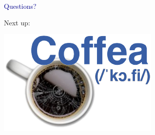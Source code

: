 \documentclass[aspectratio=169]{beamer}
\begin{document}
\begin{frame}{}
\Huge
\vspace{1 cm}
\begin{center}
\textcolor{darkblue}{Questions?}
\end{center}
\end{frame}

\begin{frame}{Next up:}
\Huge
\vspace{0.75 cm}
\begin{center}
\includegraphics[width=0.35\linewidth]{logo-coffea.pdf}
\end{center}
\end{frame}
\end{document}
